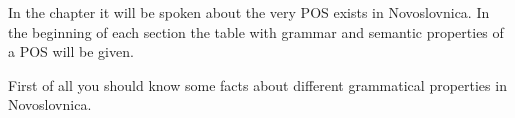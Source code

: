 In the chapter it will be spoken about the very POS exists in Novoslovnica. In the beginning of each section the table with grammar and semantic properties of a POS will be given.

First of all you should know some facts about different grammatical properties in Novoslovnica.

























